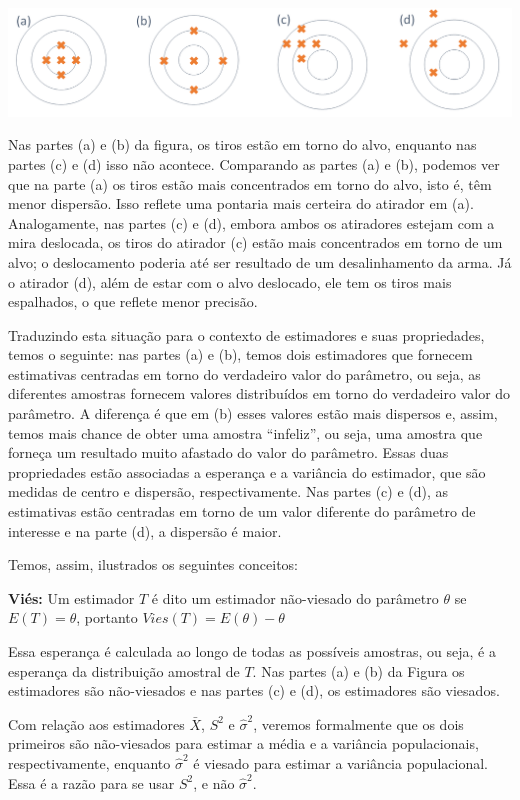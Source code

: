 \documentclass[
]{book}
\begin{document}
\includegraphics{Estimadores_exemplo.png}

Nas partes (a) e (b) da figura, os tiros estão em torno do alvo, enquanto nas partes (c) e (d) isso não acontece. Comparando as partes (a) e (b), podemos ver que na parte (a) os tiros estão mais concentrados em torno do alvo, isto é, têm menor dispersão. Isso reflete uma pontaria mais certeira do atirador em (a). Analogamente, nas partes (c) e (d), embora ambos os atiradores estejam com a mira deslocada, os tiros do atirador (c) estão mais concentrados em torno de um alvo; o deslocamento poderia até ser resultado de um desalinhamento da arma. Já o atirador (d), além de estar com o alvo deslocado, ele tem os tiros mais espalhados, o que reflete menor precisão.

Traduzindo esta situação para o contexto de estimadores e suas propriedades, temos o seguinte: nas partes (a) e (b), temos dois estimadores que fornecem estimativas centradas em torno do verdadeiro valor do parâmetro, ou seja, as diferentes amostras fornecem valores distribuídos em torno do verdadeiro valor do parâmetro. A diferença é que em (b) esses valores estão mais dispersos e, assim, temos mais chance de obter uma amostra ``infeliz'', ou seja, uma amostra que forneça um resultado muito afastado do valor do parâmetro. Essas duas propriedades estão associadas a esperança e a variância do estimador, que são medidas de centro e dispersão, respectivamente. Nas partes (c) e (d), as estimativas estão centradas em torno de um valor diferente do parâmetro de interesse e na parte (d), a dispersão é maior.

Temos, assim, ilustrados os seguintes conceitos:

\textbf{Viés:} Um estimador \(T\) é dito um estimador não-viesado do parâmetro \(\theta\) se \(E(T)=\theta\), portanto \(Vies(T)=E(\theta)-\theta\)

Essa esperança é calculada ao longo de todas as possíveis amostras, ou seja, é a esperança da distribuição amostral de \(T\). Nas partes (a) e (b) da Figura os estimadores são não-viesados e nas partes (c) e (d), os estimadores são viesados.

Com relação aos estimadores \(\bar X\), \(S^2\) e \(\hat \sigma^2\), veremos formalmente que os dois primeiros são não-viesados para estimar a média e a variância populacionais, respectivamente, enquanto \(\hat \sigma^2\) é viesado para estimar a variância populacional. Essa é a razão para se usar \(S^2\), e não \(\hat \sigma^2\).
\end{document}
